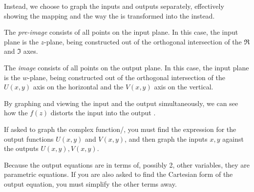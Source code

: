Instead, we choose to graph the inputs and outputs separately, effectively showing the mapping and the way the  is transformed into the  instead.

\begin{definition}\label{def:Pre_Image}
  The \emph{pre-image} consists of all points on the input plane.
  In this case, the input plane is the $z$-plane, being constructed out of the orthogonal intersection of the $\Re$ and $\Im$ axes.
\end{definition}

\begin{definition}[Image]\label{def:Image}
  The \emph{image} consists of all points on the output plane.
  In this case, the input plane is the $w$-plane, being constructed out of the orthogonal intersection of the $U(x, y)$ axis on the horizontal and the $V(x, y)$ axis on the vertical.
\end{definition}

By graphing and viewing the input and the output simultaneously, we can see how the  $f(z)$ distorts the input  into the output .

If asked to graph the complex function/, you must find the expression for the output functions $U(x, y)$ and $V(x, y)$, and then graph the inputs $x, y$ against the outputs $U(x, y), V(x, y)$.

Because the output equations are in terms of, possibly 2, other variables, they are parametric equations.
If you are also asked to find the Cartesian form of the output equation, you must simplify the other terms away.


